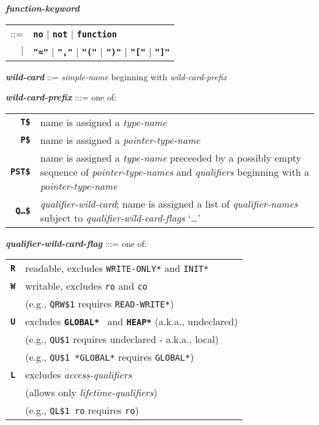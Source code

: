 \documentclass[12pt]{article}
\newcommand{\TT}[1]{{\tt \bfseries #1}}
\newcommand{\ttkey}[1]{{\tt \bfseries #1}}
\newcommand{\emkey}[1]{{\em \bfseries #1}}
\newenvironment{indpar}[1][0.3in]%
	{\begin{list}{}%
		     {\setlength{\itemsep}{0in}%
		      \setlength{\topsep}{0in}%
		      \setlength{\parsep}{1ex}%
		      \setlength{\labelwidth}{#1}%
		      \setlength{\leftmargin}{#1}%
		      \addtolength{\leftmargin}{\labelsep}}%
	 \item}%
	{\end{list}}
\begin{document}
\begin{indpar}
\emkey{function-keyword}
    \begin{tabular}[t]{rl}
    ::= & \TT{no} $|$ \TT{not} $|$ \TT{function} \\
    $|$ & \TT{"="} $|$ \TT{","} $|$ \TT{"("} $|$ \TT{")"} $|$
          \TT{"["} $|$ \TT{"]"}
    \end{tabular}

\emkey{wild-card}\label{WILD-CARD}
    ::= {\em simple-name} beginning with {\em wild-card-prefix}

\emkey{wild-card-prefix}\label{WILD-CARD-PREFIX} :::= one of: \\
\hspace*{0.2in}\begin{tabular}{rp{4in}}
\ttkey{T\$} & name is assigned a {\em type-name} \\
\ttkey{P\$} & name is assigned a {\em pointer-type-name} \\
\ttkey{PST\$} & name is assigned a {\em type-name} preceeded by a
		possibly empty sequence of {\em pointer-type-names}
	        and {\em qualifiers} beginning with
	        a {\em pointer-type-name} \\
\ttkey{Q\ldots\$} & {\em qualifier-wild-card}; name is assigned a
                    list of {\em qualifier-names} subject to
		    {\em qualifier-wild-card-flags} `\ldots'\\
\end{tabular}

\emkey{qualifier-wild-card-flag}\label{QUALIFIER-WILD-FLAG} :::= one of: \\
\hspace*{0.2in}\begin{tabular}{rl}
\ttkey{R} & readable, excludes {\tt *WRITE-ONLY*} and {\tt *INIT*} \\
\ttkey{W} & writable, excludes {\tt ro} and {\tt co} \\
          & (e.g., {\tt QRW\$1} requires {\tt *READ-WRITE*}) \\
\ttkey{U} & excludes \TT{*GLOBAL*} ~and \TT{*HEAP*} (a.k.a., undeclared) \\
          & (e.g., {\tt QU\$1} requires undeclared - a.k.a., local) \\
          & (e.g., {\tt QU\$1 *GLOBAL*} requires {\tt *GLOBAL*}) \\
\ttkey{L} & excludes {\em access-qualifiers} \\
          & (allows only {\em lifetime-qualifiers}) \\
          & (e.g., {\tt QL\$1 ro} requires {\tt ro}) \\
\end{tabular}
\end{indpar}
\end{document}
